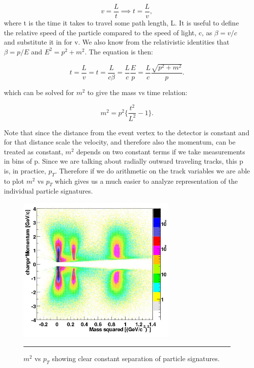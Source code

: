 \begin{equation}
v=\frac{L}{t} \implies t=\frac{L}{v},
\end{equation}
where t is the time it takes to travel some path length, L. It is useful to define the relative speed of the particle compared to the speed of light, c, as $\beta = v/c$ and substitute it in for v. We also know from the relativistic identities that $\beta = p/E$ and $E^{2} = p^{2} + m^{2}$. The equation is then: 

\begin{equation}
t=\frac{L}{v} = t=\frac{L}{c\beta} = \frac{L}{c} \frac{E}{p} = \frac{L}{c} \frac{\sqrt{p^{2} + m^{2}}}{p}.
\end{equation}

which can be solved for $m^{2}$ to give the mass vs time relation:

\begin{equation} \label{eqn:m2tof}
m^{2} = p^{2} \bigg\{ \frac{t^{2}}{L^{2}} -1 \bigg\}.
\end{equation}

Note that since the distance from the event vertex to the detector is constant and for that distance scale the velocity, and therefore also the momentum, can be treated as constant, $m^{2}$ depends on two constant terms if we take measurements in bins of p. Since we are talking about radially outward traveling tracks, this p is, in practice, $p_{T}$. Therefore if we do arithmetic on the track variables we are able to plot $m^{2}$ vs $p_{T}$ which gives us a much easier to analyze representation of the individual particle signatures.

\begin{figure}[htbp!]
  \centering
    \includegraphics[width=0.7\textwidth]{Figures/m2tofvspt.jpg}
    \rule{35em}{0.5pt}
  \caption[$m^{2}$ vs $p_{T}$ showing clear constant separation of particle signatures.]{$m^{2}$ vs $p_{T}$ showing clear constant separation of particle signatures. \citep{tofchargemom}}
  \label{fig:m2tofvspt}
\end{figure}

\pagebreak
\pagebreak
